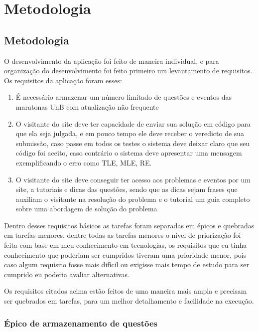 \chapter[Metodologia]{Metodologia}

\section{Metodologia}

O desenvolvimento da aplicação foi feito de maneira individual, e para organização do desenvolvimento foi feito primeiro um levantamento de requisitos. Os requisitos da aplicação foram esses:

\begin{enumerate}

    \item É necessário armazenar um número limitado de questões e eventos das maratonas UnB com     atualização não frequente
    \item O visitante do site deve ter capacidade de enviar sua solução em código para que ela seja julgada, e em pouco tempo ele deve receber o veredicto de sua submissão, caso passe em todos os testes o sistema deve deixar claro que seu código foi aceito, caso contrário o sistema deve     apresentar uma mensagem exemplificando o erro como TLE, MLE, RE.
    \item O visitante do site deve conseguir ter acesso aos problemas e eventos por um site, a tutoriais e dicas das questões, sendo que as dicas sejam frases que auxiliam o visitante na resolução do problema e o tutorial um guia completo sobre uma abordagem de solução do problema
\end{enumerate}

Dentro desses requisitos básicos as tarefas foram separadas em épicos e quebradas em tarefas menores, dentre todas as tarefas menores o nível de priorização foi feita com base em meu conhecimento em tecnologias, os requisitos que eu tinha conhecimento que poderiam ser cumpridos tiveram uma prioridade menor, pois caso algum requisito fosse mais difícil ou exigisse mais tempo de estudo para ser cumprido eu poderia avaliar alternativas.

Os requisitos citados acima estão feitos de uma maneira mais ampla e precisam ser quebrados em tarefas, para um melhor detalhamento e facilidade na execução.

\subsection{Épico de armazenamento de questões}

